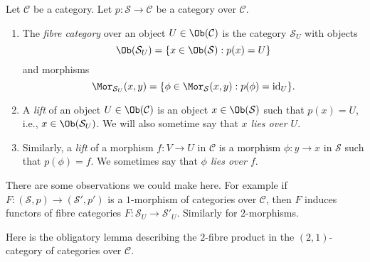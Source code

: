 \begin{definition}
\label{definition-fibre-category}
Let $\mathcal{C}$ be a category.
Let $p : \mathcal{S} \to \mathcal{C}$ be a category over $\mathcal{C}$.
\begin{enumerate}
\item The {\it fibre category} over an object $U\in \Ob(\mathcal{C})$
is the category $\mathcal{S}_U$ with objects
$$
\Ob(\mathcal{S}_U) = \{x\in \Ob(\mathcal{S}) :
p(x) = U\}
$$
and morphisms
$$
\Mor_{\mathcal{S}_U}(x, y) = \{ \phi \in \Mor_\mathcal{S}(x, y) :
p(\phi) = \text{id}_U\}.
$$
\item A {\it lift} of an object $U \in \Ob(\mathcal{C})$
is an object $x\in \Ob(\mathcal{S})$ such that $p(x) = U$, i.e.,
$x\in \Ob(\mathcal{S}_U)$. We will also sometime say
that {\it $x$ lies over $U$}.
\item Similarly, a {\it lift} of a morphism $f : V \to U$ in $\mathcal{C}$
is a morphism $\phi : y \to x$ in $\mathcal{S}$ such that $p(\phi) = f$.
We sometimes say that {\it $\phi$ lies over $f$}.
\end{enumerate}
\end{definition}

\noindent
There are some observations we could make here. For example if
$F : (\mathcal{S}, p) \to (\mathcal{S}', p')$ is a $1$-morphism
of categories over $\mathcal{C}$, then $F$ induces functors
of fibre categories $F : \mathcal{S}_U \to \mathcal{S}'_U$.
Similarly for $2$-morphisms.

\medskip\noindent
Here is the obligatory lemma describing the $2$-fibre product in the
$(2, 1)$-category of categories over $\mathcal{C}$.

